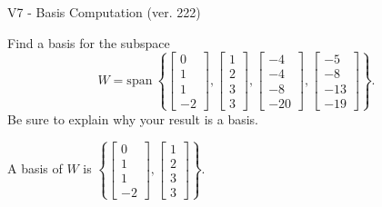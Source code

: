 \begin{exercise}
  \begin{exerciseTitle}V7 - Basis Computation (ver. 222)\end{exerciseTitle}
  \begin{exerciseStatement}
    Find a basis for the subspace 
\[W=\mathrm{span}\ \left\{\left[\begin{array}{r}
0 \\
1 \\
1 \\
-2
\end{array}\right] , \left[\begin{array}{r}
1 \\
2 \\
3 \\
3
\end{array}\right] , \left[\begin{array}{r}
-4 \\
-4 \\
-8 \\
-20
\end{array}\right] , \left[\begin{array}{r}
-5 \\
-8 \\
-13 \\
-19
\end{array}\right]\right\}.\]
 Be sure to explain why your result is a basis.


  \end{exerciseStatement}
  \begin{exerciseAnswer}
   A basis of \(W\) is  \(\left\{\left[\begin{array}{r}
0 \\
1 \\
1 \\
-2
\end{array}\right] , \left[\begin{array}{r}
1 \\
2 \\
3 \\
3
\end{array}\right]\right\}\).
  


  \end{exerciseAnswer}
\end{exercise}